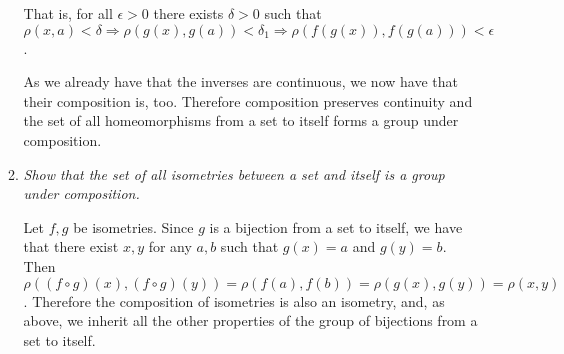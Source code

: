 \documentclass[10pt]{article}
\begin{document}
\begin{enumerate}
\begin{enumerate}
That is, for all $\epsilon>0$ there exists $\delta>0$ such that $\rho(x,a)<\delta \Rightarrow \rho(g(x),g(a))<\delta_1 \Rightarrow \rho(f(g(x)),f(g(a)))<\epsilon$.

As we already have that the inverses are continuous, we now have that their composition is, too.  Therefore composition preserves continuity and the set of all homeomorphisms from a set to itself forms a group under composition.

\item \emph{Show that the set of all isometries between a set and itself is a group under composition.}

Let $f,g$ be isometries.  Since $g$ is a bijection from a set to itself, we have that there exist $x,y$ for any $a,b$ such that $g(x)=a$ and $g(y)=b$.  Then $\rho((f \circ g)(x),(f \circ g)(y)) = \rho(f(a),f(b)) = \rho(g(x),g(y)) = \rho(x,y)$.  Therefore the composition of isometries is also an isometry, and, as above, we inherit all the other properties of the group of bijections from a set to itself.
\end{enumerate}
\end{enumerate}
\end{document}
